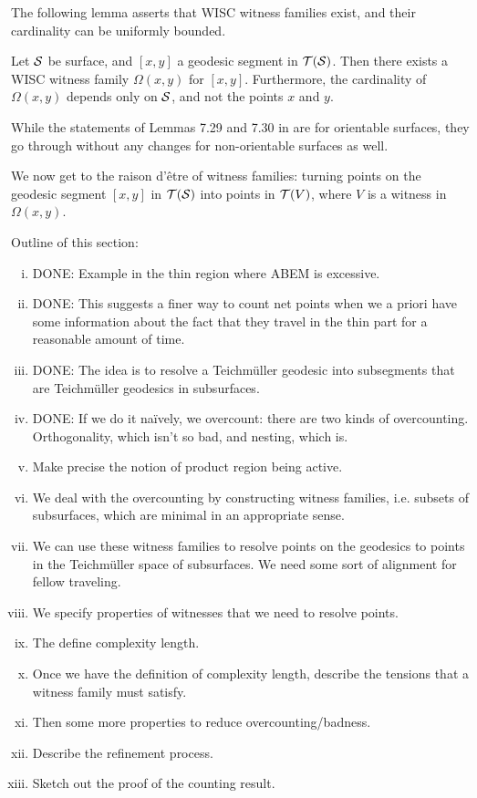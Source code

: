\documentclass[12pt, reqno]{amsart}
\begin{document}
  The following lemma asserts that WISC witness families exist, and their cardinality can be uniformly bounded.
  \begin{lemma}
    Let $\mathcal{S}$ be surface, and $[x,y]$ a geodesic segment in $\mathcal{T}(\mathcal{S})$.
    Then there exists a WISC witness family $\Omega(x,y)$ for $[x,y]$.
    Furthermore, the cardinality of $\Omega(x,y)$ depends only on $\mathcal{S}$, and not the points $x$ and $y$.
  \end{lemma}
  \begin{rem}
    While the statements of Lemmas 7.29 and 7.30 in \textcite{dowdall2023lattice} are for orientable surfaces, they go through without any changes for non-orientable surfaces as well.
  \end{rem}

  We now get to the raison d'\^etre of witness families: turning points on the geodesic segment $[x,y]$ in $\mathcal{T}(\mathcal{S})$ into points in $\mathcal{T}(V)$, where $V$ is a witness in $\Omega(x,y)$.


Outline of this section:
\begin{enumerate}[(i)]
\item {\color{red} DONE:} {Example in the thin region where ABEM is excessive.}
\item {\color{red} DONE:} This suggests a finer way to count net points when we a priori have some information about the fact that they travel in the thin part for a reasonable amount of time.
\item {\color{red} DONE:} The idea is to resolve a Teichmüller geodesic into subsegments that are Teichmüller geodesics in subsurfaces.
\item {\color{red} DONE:} If we do it naïvely, we overcount: there are two kinds of overcounting. Orthogonality, which isn't so bad, and nesting, which is.
\item Make precise the notion of product region being active.
\item We deal with the overcounting by constructing witness families, i.e. subsets of subsurfaces, which are minimal in an appropriate sense.
\item We can use these witness families to resolve points on the geodesics to points in the Teichmüller space of subsurfaces. We need some sort of alignment for fellow traveling.
\item We specify properties of witnesses that we need to resolve points.
\item The define complexity length.
\item Once we have the definition of complexity length, describe the tensions that a witness family must satisfy.
\item Then some more properties to reduce overcounting/badness.
\item Describe the refinement process.
\item Sketch out the proof of the counting result.
\end{enumerate}
\end{document}
